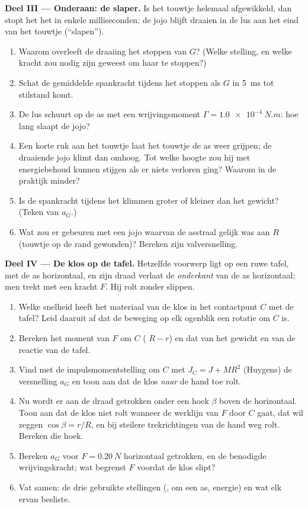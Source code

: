 \begin{problem}
\medskip
\noindent\textbf{Deel III --- Onderaan: de slaper.}
Is het touwtje helemaal afgewikkeld, dan stopt het het  in enkele
milliseconden; de jojo blijft draaien in de lus aan het eind van het
touwtje (``slapen'').
\begin{enumerate}[resume]
  \item Waarom overleeft de draaiing het stoppen van $G$? (Welke stelling, en
        welke kracht zou nodig zijn geweest om haar te stoppen?)
  \item Schat de gemiddelde spankracht tijdens het stoppen als $G$ in
        \qty{5}{ms} tot stilstand komt.
  \item De lus schuurt op de as met een wrijvingsmoment $\Gamma =
        \qty{1.0e-4}{N.m}$: hoe lang slaapt de jojo?
  \item Een korte ruk aan het touwtje laat het touwtje de as weer grijpen;
        de draaiende jojo klimt dan omhoog. Tot welke hoogte zou hij met
        energiebehoud kunnen stijgen als er niets verloren ging? Waarom in de
        praktijk minder?
  \item Is de spankracht tijdens het klimmen groter of kleiner dan het
        gewicht? (Teken van $a_G$.)
  \item Wat zou er gebeuren met een jojo waarvan de asstraal gelijk was aan $R$
        (touwtje op de rand gewonden)? Bereken zijn valversnelling.
\end{enumerate}

\medskip
\noindent\textbf{Deel IV --- De klos op de tafel.}
Hetzelfde voorwerp ligt op een ruwe tafel, met de as horizontaal, en zijn draad
verlaat de \emph{onderkant} van de as horizontaal; men trekt met een
kracht $F$. Hij rolt zonder slippen.
\begin{enumerate}[resume]
  \item Welke snelheid heeft het materiaal van de klos in het contactpunt $C$
        met de tafel? Leid daaruit af dat de beweging op elk
        ogenblik een rotatie om $C$ is.
  \item Bereken het moment van $F$ om $C$ ( $R - r$) en dat
        van het gewicht en van de reactie van de tafel.
  \item Vind met de impulsmomentstelling om $C$ met $J_C = J +
        MR^2$ (Huygens) de versnelling $a_G$ en toon aan dat de klos
        \emph{naar} de hand toe rolt.
  \item Nu wordt er aan de draad getrokken onder een hoek $\beta$ boven de
        horizontaal. Toon aan dat de klos niet rolt wanneer de werklijn
        van $F$ door $C$ gaat, dat wil zeggen $\cos\beta = r/R$, en
        bij steilere trekrichtingen van de hand weg rolt. Bereken die hoek.
  \item Bereken $a_G$ voor $F = \qty{0.20}{N}$ horizontaal getrokken, en
        de benodigde wrijvingskracht; wat begrenst $F$ voordat de klos
        slipt?
  \item Vat samen: de drie gebruikte stellingen (, 
        om een as, energie) en wat elk ervan besliste.
\end{enumerate}
\end{problem}
